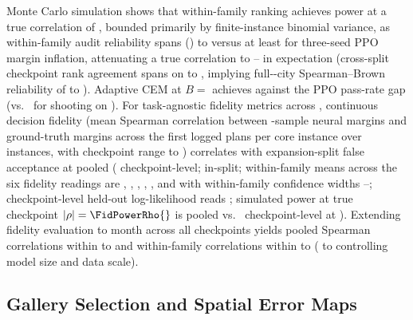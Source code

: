 Monte Carlo simulation shows that within-family ranking achieves \AcSimPower{} power at a true correlation of \MainRhoBar{}, bounded primarily by finite-instance binomial variance, as within-family audit reliability spans \AcRelMin{} (\emph{\AcRelMinFam{}}) to \AcRelMax{} versus at least \AcRlRelMin{} for three-seed PPO margin inflation, attenuating a true \MainRhoBar{} correlation to \AcAttenMin{}--\AcAttenMax{} in expectation (cross-split checkpoint rank agreement spans \AcSplitMin{} on \emph{\AcSplitMinFam{}} to \AcSplitMax{}, implying full-\AllCities-city Spearman--Brown reliability of \AcSbMin{} to \AcSbMax{}). Adaptive CEM at $B ={}$ achieves \AcAdGapRho{} \ci{\AcAdGapRhoCI} against the PPO pass-rate gap (vs.\ \AcAdRandRho{} \ci{\AcAdRandRhoCI} for shooting on \AcAdSetName{}). For task-agnostic fidelity metrics across \AcFidSetName{}, continuous decision fidelity (mean Spearman correlation between \KSearch-sample neural margins and ground-truth margins across the first \DecFidPlans{} logged plans per core instance over \AcDecFidInstances{} instances, with checkpoint range \AcDecFidMin{} to \AcDecFidMax{}) correlates with expansion-split false acceptance at \AcFidDecRho{} pooled (\AcFidDecCkptRho{} checkpoint-level; \AcFidDecSameRho{} in-split; within-family means across the six fidelity readings are \AcFidFOneWithin{}, \AcFidFTwelveWithin{}, \AcFidFundsWithin{}, \AcFidPopWithin{}, \AcFidLikWithin{}, and \AcFidDecWithin{} with within-family confidence widths \AcFidWithinWidthMin{}--\AcFidWithinWidthMax{}; checkpoint-level held-out log-likelihood reads \AcFidLikCkptRho{}; simulated power at true checkpoint $|\rho| = \FidPowerRho{}$ is \AcFidPowerFals{} pooled vs.\ \AcFidPowerCkpt{} checkpoint-level at \AcFidPowerCkptRho{}). Extending fidelity evaluation to month \Horizon{} across all \AcHorAllCkpts{} checkpoints yields pooled Spearman correlations within \AcHorRhoMin{} to \AcHorRhoMax{} and within-family correlations within \AcHorWithinMin{} to \AcHorWithinMax{} (\AcHorPartMin{} to \AcHorPartMax{} controlling model size and data scale).
\fi

\subsection{Gallery Selection and Spatial Error Maps}\label{app:gallery}

